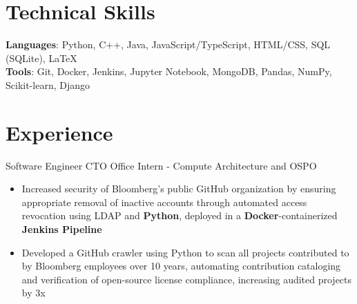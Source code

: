 \documentclass[letterpaper,11pt]{article}
\begin{document}
\section{Technical Skills}
\textbf{Languages}: Python, C++, Java, JavaScript/TypeScript, HTML/CSS, SQL
(SQLite), \LaTeX \\
\textbf{Tools}: Git, Docker, Jenkins, Jupyter Notebook,
MongoDB, Pandas, NumPy, Scikit-learn, Django

\section{Experience}
{Software Engineer}{}
{CTO Office Intern - Compute Architecture and OSPO}{}
\begin{itemize}[leftmargin=*]
    \item \vspace{-3pt} \small Increased security of Bloomberg's public GitHub
          organization by ensuring appropriate removal of inactive accounts
          through automated access revocation using LDAP and
          \textbf{Python}, deployed in a \textbf{Docker}-containerized
          \textbf{Jenkins Pipeline}
    \item \vspace{-7pt} \small Developed a GitHub crawler using Python to scan
          all projects contributed to by Bloomberg employees over 10 years,
          automating contribution cataloging and
          verification of open-source license compliance,
          increasing audited projects by 3x
\end{itemize}

\end{document}
